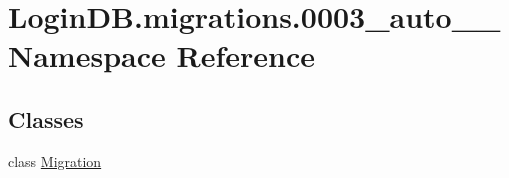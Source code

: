 \hypertarget{namespace_login_d_b_1_1migrations_1_10003__auto__20201206__1730}{}\section{Login\+D\+B.\+migrations.0003\+\_\+auto\+\_\+\_ Namespace Reference}
\label{namespace_login_d_b_1_1migrations_1_10003__auto__20201206__1730}
\subsection*{Classes}
\begin{DoxyCompactItemize}
\item 
class \hyperlink{class_login_d_b_1_1migrations_1_10003__auto__20201206__1730_1_1_migration}{Migration}
\end{DoxyCompactItemize}
